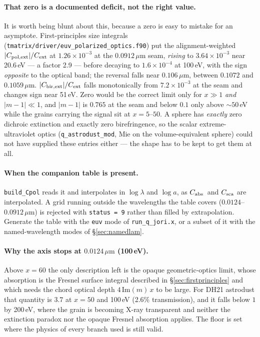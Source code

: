 \documentclass{my_memo}
\newcommand{\code}[1]{\texttt{#1}}
\newcommand{\um}{\ensuremath{\,\mu\mathrm{m}}}
\newcommand{\Cabs}{\ensuremath{C_{\rm abs}}}
\begin{document}
\paragraph{That zero is a documented deficit, not the right value.} It is worth
being blunt about this, because a zero is easy to mistake for an asymptote.
First-principles size integrals
(\code{tmatrix/driver/euv\_polarized\_optics.f90}) put the alignment-weighted
$|C_{\rm pol,ext}|/C_{\rm ext}$ at $1.26\times10^{-3}$ at the $0.0912\um$ seam,
\emph{rising} to $3.64\times10^{-3}$ near 20.6\,eV --- a factor 2.9 --- before
decaying to $1.6\times10^{-4}$ at 100\,eV, with the sign \emph{opposite} to the
optical band; the reversal falls near $0.106\um$, between $0.1072$ and
$0.1059\um$. $|C_{\rm bir,ext}|/C_{\rm ext}$ falls monotonically from
$7.2\times10^{-3}$ at the seam and changes sign near 51\,eV. Zero would be the
correct limit only for $x\gg1$ \emph{and} $|m-1|\ll1$, and $|m-1|$ is $0.765$ at
the seam and below $0.1$ only above ${\sim}50$\,eV while the grains carrying the
signal sit at $x = 5$--$50$. A sphere has \emph{exactly} zero dichroic extinction
and exactly zero birefringence, so the scalar extreme-ultraviolet optics
(\code{q\_astrodust\_mod}, Mie on the volume-equivalent sphere) could not have
supplied these entries either --- the shape has to be kept to get them at all.

\paragraph{When the companion table is present.} \code{build\_Cpol} reads it and
interpolates in $\log\lambda$ and $\log a$, as \Cabs\ and $C_{\rm sca}$ are
interpolated. A grid running outside the wavelengths the table covers
($0.0124$--$0.0912\um$) is rejected with \code{status = 9} rather than filled by
extrapolation. Generate the table with the \code{euv} mode of
\code{run\_q\_jori.x}, or a subset of it with the named-wavelength modes of
\S\ref{sec:namedlam}.

\paragraph{Why the axis stops at $0.0124\um$ (100\,eV).} Above $x = 60$ the only
description left is the opaque geometric-optics limit, whose absorption is the
Fresnel surface integral described in \S\ref{sec:firstprinciples} and which needs
the chord optical depth $4\,\mathrm{Im}(m)\,x$ to be large. For DH21 astrodust
that quantity is $3.7$ at $x = 50$ and 100\,eV (2.6\% transmission), and it falls
below $1$ by 200\,eV, where the grain is becoming X-ray transparent and neither
the extinction paradox nor the opaque Fresnel absorption applies. The floor is
set where the physics of every branch used is still valid.
\end{document}
